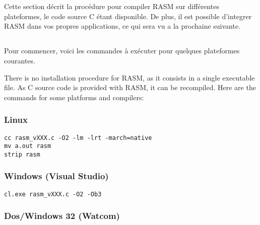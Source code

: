 \section{}

\begin{xfr}
Cette section décrit la procédure pour compiler RASM sur différentes plateformes, le code source C étant disponible. De plus, il est possible d'integrer RASM dans vos propres applications, ce qui sera vu a la prochaine suivante. 
\end{xfr}

\subsection{}

\begin{xfr}
Pour commencer, voici les commandes à exécuter pour quelques plateformes courantes.
\end{xfr}

\begin{xen}
There is no installation procedure for RASM, as it consists in a single executable file. As C source code is provided with RASM, it can be recompiled. Here are the commands for some platforms and compilers:
\end{xen}

\subsubsection{Linux}

\begin{verbatim}
cc rasm_vXXX.c -O2 -lm -lrt -march=native
mv a.out rasm
strip rasm
\end{verbatim}

\subsubsection{Windows (Visual Studio)}

\begin{verbatim}
cl.exe rasm_vXXX.c -O2 -Ob3
\end{verbatim}

\subsubsection{Dos/Windows 32 (Watcom)}

